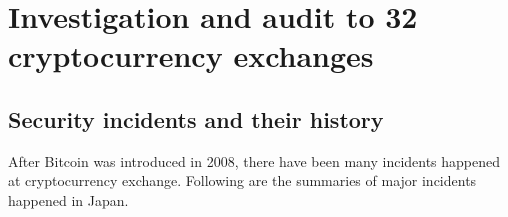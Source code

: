 \section{Investigation and audit to 32 cryptocurrency exchanges}
\label{investigation}
\subsection{Security incidents and their history}
\label{subsec-incidents}
After Bitcoin was introduced in 2008, there have been many incidents happened at cryptocurrency exchange. Following are the summaries of major incidents happened in Japan.
%

